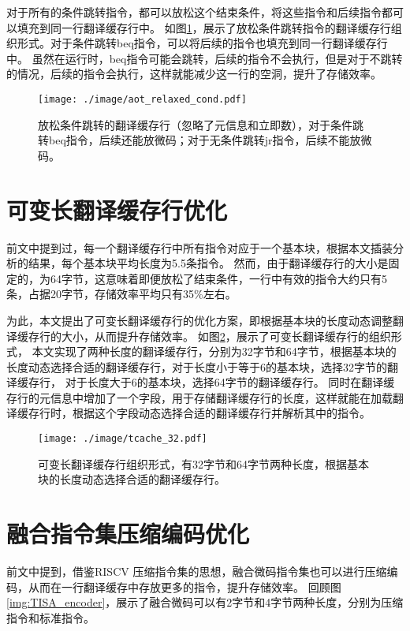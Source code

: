 对于所有的条件跳转指令，都可以放松这个结束条件，将这些指令和后续指令都可以填充到同一行翻译缓存行中。
如图\ref{img:aot_relaxed_cond}，展示了放松条件跳转指令的翻译缓存行组织形式。对于条件跳转beq指令，可以将后续的指令也填充到同一行翻译缓存行中。
虽然在运行时，beq指令可能会跳转，后续的指令不会执行，但是对于不跳转的情况，后续的指令会执行，这样就能减少这一行的空洞，提升了存储效率。


\begin{figure}[!htbp]
    \centering
    \texttt{[image: ./image/aot\_relaxed\_cond.pdf]}
    \caption{放松条件跳转的翻译缓存行（忽略了元信息和立即数），对于条件跳转beq指令，后续还能放微码；对于无条件跳转jr指令，后续不能放微码。}
    \label{img:aot_relaxed_cond}
  \end{figure}


\section{可变长翻译缓存行优化}

前文中提到过，每一个翻译缓存行中所有指令对应于一个基本块，根据本文插装分析的结果，每个基本块平均长度为5.5条指令。
然而，由于翻译缓存行的大小是固定的，为64字节，这意味着即便放松了结束条件，一行中有效的指令大约只有5条，占据20字节，存储效率平均只有35\%左右。

为此，本文提出了可变长翻译缓存行的优化方案，即根据基本块的长度动态调整翻译缓存行的大小，从而提升存储效率。
如图\ref{img:tcache_32}，展示了可变长翻译缓存行的组织形式，
本文实现了两种长度的翻译缓存行，分别为32字节和64字节，根据基本块的长度动态选择合适的翻译缓存行，对于长度小于等于6的基本块，选择32字节的翻译缓存行，
对于长度大于6的基本块，选择64字节的翻译缓存行。
同时在翻译缓存行的元信息中增加了一个字段，用于存储翻译缓存行的长度，这样就能在加载翻译缓存行时，根据这个字段动态选择合适的翻译缓存行并解析其中的指令。

\begin{figure}[!htbp]
    \centering
    \texttt{[image: ./image/tcache\_32.pdf]}
    \caption{可变长翻译缓存行组织形式，有32字节和64字节两种长度，根据基本块的长度动态选择合适的翻译缓存行。}
    \label{img:tcache_32}
  \end{figure}


\section{融合指令集压缩编码优化}

前文中提到，借鉴RISCV 压缩指令集的思想，融合微码指令集也可以进行压缩编码，从而在一行翻译缓存中存放更多的指令，提升存储效率。
回顾图\ref{img:TISA_encoder}，展示了融合微码可以有2字节和4字节两种长度，分别为压缩指令和标准指令。

